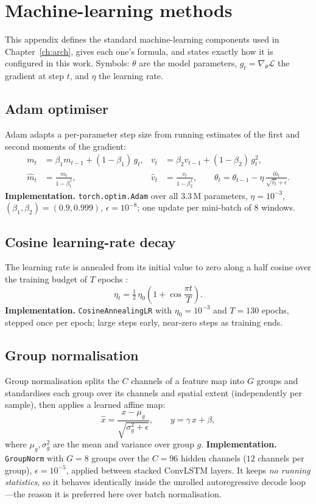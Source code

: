 \chapter{Machine-learning methods}
\label{app:methods}

This appendix defines the standard machine-learning components used in
Chapter~\ref{ch:arch}, gives each one's formula, and states exactly how it is
configured in this work. Symbols: $\theta$ are the model parameters, $g_t=\nabla_\theta
\mathcal{L}$ the gradient at step $t$, and $\eta$ the learning rate.

\section{Adam optimiser}
Adam \citep{kingma2015} adapts a per-parameter step size from running estimates of
the first and second moments of the gradient:
\begin{align}
  m_t &= \beta_1 m_{t-1} + (1-\beta_1)\,g_t, &
  v_t &= \beta_2 v_{t-1} + (1-\beta_2)\,g_t^2, \nonumber\\
  \hat{m}_t &= \frac{m_t}{1-\beta_1^{\,t}}, &
  \hat{v}_t &= \frac{v_t}{1-\beta_2^{\,t}}, \qquad
  \theta_t = \theta_{t-1} - \eta\,\frac{\hat{m}_t}{\sqrt{\hat{v}_t}+\epsilon}.
\end{align}
\textbf{Implementation.} \texttt{torch.optim.Adam} over all $3.3$\,M parameters,
$\eta=10^{-3}$, $(\beta_1,\beta_2)=(0.9,0.999)$, $\epsilon=10^{-8}$; one update per
mini-batch of $8$ windows.

\section{Cosine learning-rate decay}
The learning rate is annealed from its initial value to zero along a half cosine
over the training budget of $T$ epochs \citep{loshchilov2017}:
\begin{equation}
  \eta_t = \tfrac{1}{2}\,\eta_0\left(1 + \cos\frac{\pi t}{T}\right).
\end{equation}
\textbf{Implementation.} \texttt{CosineAnnealingLR} with $\eta_0=10^{-3}$ and
$T=130$ epochs, stepped once per epoch; large steps early, near-zero steps as
training ends.

\section{Group normalisation}
Group normalisation \citep{wu2018} splits the $C$ channels of a feature map into
$G$ groups and standardises each group over its channels and spatial extent
(independently per sample), then applies a learned affine map:
\begin{equation}
  \hat{x} = \frac{x-\mu_g}{\sqrt{\sigma_g^2+\epsilon}},\qquad y=\gamma\,\hat{x}+\beta,
\end{equation}
where $\mu_g,\sigma_g^2$ are the mean and variance over group $g$.
\textbf{Implementation.} \texttt{GroupNorm} with $G=8$ groups over the $C=96$
hidden channels ($12$ channels per group), $\epsilon=10^{-5}$, applied between
stacked ConvLSTM layers. It keeps \emph{no running statistics}, so it behaves
identically inside the unrolled autoregressive decode loop---the reason it is
preferred here over batch normalisation.

